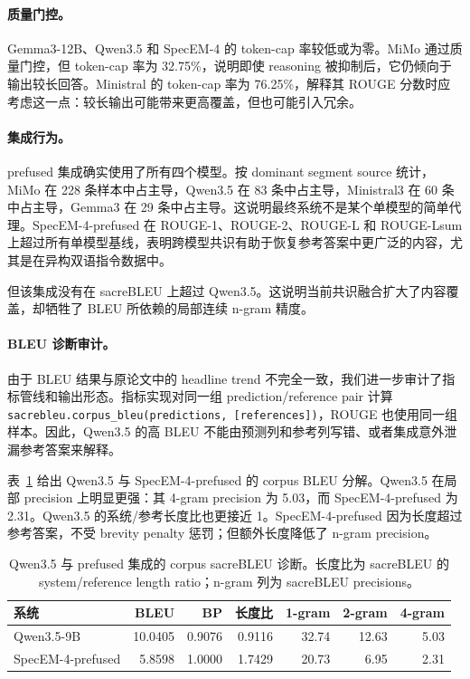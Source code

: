 \documentclass[11pt]{ctexart}
\begin{document}
\paragraph{质量门控。}
Gemma3-12B、Qwen3.5 和 SpecEM-4 的 token-cap 率较低或为零。MiMo 通过质量门控，但 token-cap 率为 32.75\%，说明即使 reasoning 被抑制后，它仍倾向于输出较长回答。Ministral 的 token-cap 率为 76.25\%，解释其 ROUGE 分数时应考虑这一点：较长输出可能带来更高覆盖，但也可能引入冗余。

\paragraph{集成行为。}
prefused 集成确实使用了所有四个模型。按 dominant segment source 统计，MiMo 在 228 条样本中占主导，Qwen3.5 在 83 条中占主导，Ministral3 在 60 条中占主导，Gemma3 在 29 条中占主导。这说明最终系统不是某个单模型的简单代理。SpecEM-4-prefused 在 ROUGE-1、ROUGE-2、ROUGE-L 和 ROUGE-Lsum 上超过所有单模型基线，表明跨模型共识有助于恢复参考答案中更广泛的内容，尤其是在异构双语指令数据中。

但该集成没有在 sacreBLEU 上超过 Qwen3.5。这说明当前共识融合扩大了内容覆盖，却牺牲了 BLEU 所依赖的局部连续 n-gram 精度。

\paragraph{BLEU 诊断审计。}
由于 BLEU 结果与原论文中的 headline trend 不完全一致，我们进一步审计了指标管线和输出形态。指标实现对同一组 prediction/reference pair 计算 \texttt{sacrebleu.corpus\_bleu(predictions, [references])}，ROUGE 也使用同一组样本。因此，Qwen3.5 的高 BLEU 不能由预测列和参考列写错、或者集成意外泄漏参考答案来解释。

表~\ref{tab:bleu-diagnostics} 给出 Qwen3.5 与 SpecEM-4-prefused 的 corpus BLEU 分解。Qwen3.5 在局部 precision 上明显更强：其 4-gram precision 为 5.03，而 SpecEM-4-prefused 为 2.31。Qwen3.5 的系统/参考长度比也更接近 1。SpecEM-4-prefused 因为长度超过参考答案，不受 brevity penalty 惩罚；但额外长度降低了 n-gram precision。

\begin{table}[h]
\centering
\begin{tabular}{lrrrrrr}
\toprule
系统 & BLEU & BP & 长度比 & 1-gram & 2-gram & 4-gram \\
\midrule
Qwen3.5-9B & 10.0405 & 0.9076 & 0.9116 & 32.74 & 12.63 & 5.03 \\
SpecEM-4-prefused & 5.8598 & 1.0000 & 1.7429 & 20.73 & 6.95 & 2.31 \\
\bottomrule
\end{tabular}
\caption{Qwen3.5 与 prefused 集成的 corpus sacreBLEU 诊断。长度比为 sacreBLEU 的 system/reference length ratio；n-gram 列为 sacreBLEU precisions。}
\label{tab:bleu-diagnostics}
\end{table}
\end{document}
